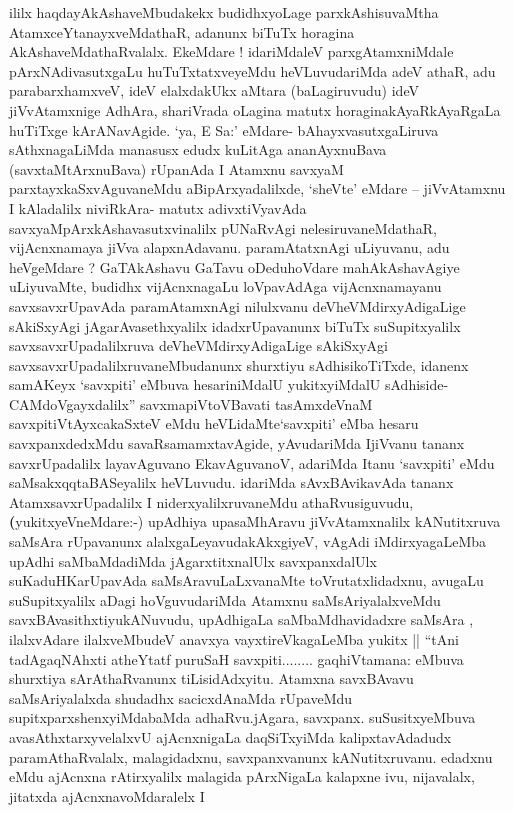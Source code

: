 \begin{artha}
ililx haqdayAkAshaveMbudakekx budidhxyoLage parxkAshisuvaMtha
AtamxceYtanayxveMdathaR, adanunx biTuTx horagina
AkAshaveMdathaRvalalx. EkeMdare ! idariMdaleV parxgAtamxniMdale
pArxNAdivasutxgaLu huTuTxtatxveyeMdu heVLuvudariMda adeV athaR, adu
parabarxhamxveV, ideV elalxdakUkx aMtara (baLagiruvudu) ideV
jiVvAtamxnige AdhAra, shariVrada oLagina matutx horaginakAyaRkAyaRgaLa
huTiTxge kArANavAgide. `ya, E Sa:' eMdare- bAhayxvasutxgaLiruva
sAthxnagaLiMda manasusx edudx kuLitAga ananAyxnuBava
(savxtaMtArxnuBava) rUpanAda I Atamxnu savxyaM parxtayxkaSxvAguvaneMdu
aBipArxyadalilxde, `sheVte' eMdare -- jiVvAtamxnu I kAladalilx
niviRkAra- matutx adivxtiVyavAda savxyaMpArxkAshavasutxvinalilx
pUNaRvAgi nelesiruvaneMdathaR, vijAcnxnamaya jiVva
alapxnAdavanu. paramAtatxnAgi uLiyuvanu, adu heVgeMdare ? GaTAkAshavu
GaTavu oDeduhoVdare mahAkAshavAgiye uLiyuvaMte, budidhx vijAcnxnagaLu
loVpavAdAga vijAcnxnamayanu savxsavxrUpavAda paramAtamxnAgi nilulxvanu
deVheVMdirxyAdigaLige sAkiSxyAgi jAgarAvasethxyalilx idadxrUpavanunx
biTuTx suSupitxyalilx savxsavxrUpadalilxruva deVheVMdirxyAdigaLige
sAkiSxyAgi savxsavxrUpadalilxruvaneMbudanunx shurxtiyu sAdhisikoTiTxde, idanenx
samAKeyx `savxpiti' eMbuva hesariniMdalU yukitxyiMdalU sAdhiside-
CAMdoVgayxdalilx'' savxmapiVtoVBavati tasAmxdeVnaM
savxpitiVtAyxcakaSxteV eMdu heVLidaMte`savxpiti' eMba hesaru
savxpanxdedxMdu savaRsamamxtavAgide, yAvudariMda IjiVvanu tananx
savxrUpadalilx layavAguvano EkavAguvanoV, adariMda Itanu `savxpiti'
eMdu saMsakxqqtaBASeyalilx heVLuvudu. idariMda sAvxBAvikavAda tananx
AtamxsavxrUpadalilx I niderxyalilxruvaneMdu
athaRvusiguvudu,\textbf(yukitxyeVneMdare:-) upAdhiya upasaMhAravu
jiVvAtamxnalilx kANutitxruva saMsAra rUpavanunx
alalxgaLeyavudakAkxgiyeV, vAgAdi iMdirxyagaLeMba upAdhi saMbaMdadiMda
jAgarxtitxnalUlx savxpanxdalUlx suKaduHKarUpavAda saMsAravuLaLxvanaMte
toVrutatxlidadxnu, avugaLu suSupitxyalilx aDagi hoVguvudariMda Atamxnu
saMsAriyalalxveMdu savxBAvasithxtiyukANuvudu, upAdhigaLa
saMbaMdhavidadxre saMsAra , ilalxvAdare ilalxveMbudeV anavxya
vayxtireVkagaLeMba yukitx || ``tAni tadAgaqNAhxti atheYtatf puruSaH
savxpiti........ gaqhiVtamana: eMbuva shurxtiya sArAthaRvanunx
tiLisidAdxyitu. Atamxna savxBAvavu saMsAriyalalxda shudadhx
sacicxdAnaMda rUpaveMdu supitxparxshenxyiMdabaMda adhaRvu.jAgara,
savxpanx. suSusitxyeMbuva avasAthxtarxyvelalxvU ajAcnxnigaLa
daqSiTxyiMda kalipxtavAdadudx paramAthaRvalalx, malagidadxnu,
savxpanxvanunx kANutitxruvanu. edadxnu eMdu ajAcnxna rAtirxyalilx malagida
pArxNigaLa kalapxne ivu, nijavalalx, jitatxda ajAcnxnavoMdaralelx I

\end{artha}

